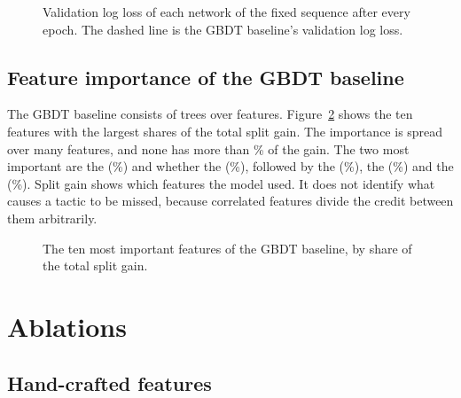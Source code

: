 \documentclass[11pt]{article}
\begin{document}
\begin{figure}[htbp]\centering
{}
\caption{Validation log loss of each network of the fixed sequence after
every epoch. The dashed line is the GBDT baseline's validation log loss.}
\label{fig:curves}
\end{figure}

\subsection{Feature importance of the GBDT baseline}

The GBDT baseline consists of  trees over
 features. Figure~\ref{fig:leans} shows the ten
features with the largest shares of the total split gain. The importance is spread over many features,
and none has more than \% of the gain. The two
most important are the 
(\%) and whether the 
(\%), followed by the 
(\%), the 
(\%) and the 
(\%). Split gain shows which features the model
used. It does not identify what causes a tactic to be missed, because
correlated features divide the credit between them arbitrarily.

\begin{figure}[htbp]\centering
{}
\caption{The ten most important features of the GBDT baseline, by share of
the total split gain.}
\label{fig:leans}
\end{figure}

\ifchanges
\section{Ablations}
\label{sec:ablations}



\ifchangehand
\subsection{Hand-crafted features}
\end{document}
